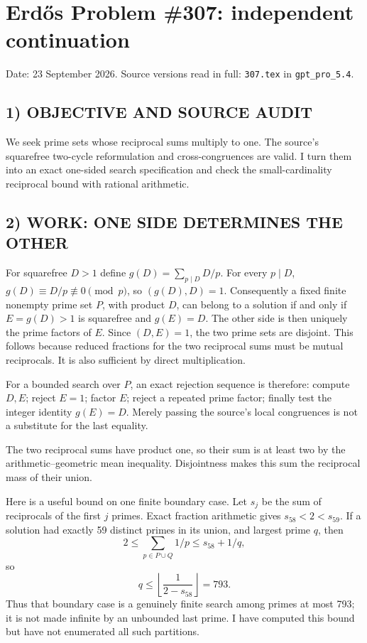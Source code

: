 \section{Erd\H{o}s Problem \#307: independent continuation}
\noindent Date: 23 September 2026. Source versions read in full: \texttt{307.tex} in \texttt{gpt\_pro\_5.4}.

\subsection*{1) OBJECTIVE AND SOURCE AUDIT}
We seek prime sets whose reciprocal sums multiply to one. The source's
squarefree two-cycle reformulation and cross-congruences are valid. I
turn them into an exact one-sided search specification and check the
small-cardinality reciprocal bound with rational arithmetic.

\subsection*{2) WORK: ONE SIDE DETERMINES THE OTHER}
For squarefree $D>1$ define $g(D)=\sum_{p\mid D}D/p$. For every $p\mid D$,
$g(D)\equiv D/p\not\equiv0\pmod p$, so $(g(D),D)=1$. Consequently a
fixed finite nonempty prime set $P$, with product $D$, can belong to a
solution if and only if $E=g(D)>1$ is squarefree and $g(E)=D$.
The other side is then uniquely the prime factors of $E$. Since $(D,E)=1$, the two prime sets are disjoint.
This follows because reduced fractions for the two reciprocal sums must
be mutual reciprocals. It is also sufficient by direct multiplication.

For a bounded search over $P$, an exact rejection sequence is therefore:
compute $D,E$; reject $E=1$; factor $E$; reject a repeated prime factor;
finally test the integer identity $g(E)=D$. Merely passing the source's
local congruences is not a substitute for the last equality.

The two reciprocal sums have product one, so their sum is at least two by the arithmetic--geometric mean inequality. Disjointness makes this sum the reciprocal mass of their union.

Here is a useful bound on one finite boundary case. Let $s_j$ be the
sum of reciprocals of the first $j$ primes. Exact fraction arithmetic gives
$s_{58}<2<s_{59}$. If a solution had exactly 59 distinct primes in its
union, and largest prime $q$, then
\[
 2\le\sum_{p\in P\cup Q}1/p\le s_{58}+1/q,
\]
so
\[
 q\le\left\lfloor\frac1{2-s_{58}}\right\rfloor=793.
\]
Thus that boundary case is a genuinely finite search among primes at most
793; it is not made infinite by an unbounded last prime. I have computed
this bound but have not enumerated all such partitions.

